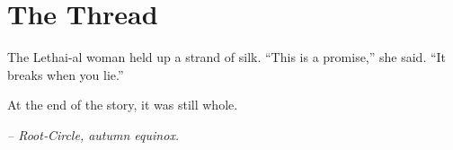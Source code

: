 \chapter*{The Thread}

The Lethai‑al woman held up a strand of silk. “This is a promise,” she said. “It breaks when you lie.”

At the end of the story, it was still whole.

\smallskip

\noindent \textit{– Root‑Circle, autumn equinox.}

